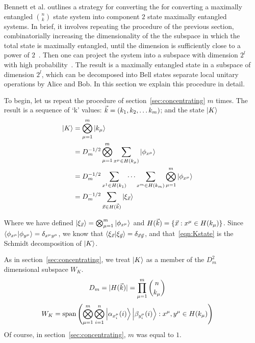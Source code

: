 Bennett et al. outlines a strategy for converting the for converting a maximally entangled $\binom{n}{k}$ state system into component $2$ state maximally entangled systems. 
In brief, it involves repeating the procedure of the previous section, combinatorially increasing the dimensionality of the the subspace in which the total state is maximally entangled, until the dimension is sufficiently close to a power of $2$~\cite{bennett1996concentrating}.
Then one can project the system into a subspace with dimension $2^l$ with high probability~\cite{bennett1996concentrating}.
The result is a maximally entangled state in a subspace of dimension $2^l$, which can be decomposed into Bell states separate local unitary operations by Alice and Bob.
In this section we explain this procedure in detail.

To begin, let us repeat the procedure of section~\ref{sec:concentrating} $m$ times. The result is a sequence of `k' values: ${\vec{k}} = \left( k_1, k_2,\ldots k_m \right)$; and the state
$\ket{K}$
\begin{align}
\ket{K} &= \bigotimes_{\mu=1}^m \ket{k_\mu} \nonumber \\
&= D_m^{-1/2} \bigotimes_{\mu=1}^m \sum_{x^\mu \in H(k_\mu)} \ket{\phi_{x^\mu}} \nonumber \\
&=  D_m^{-1/2} \sum_{x^1 \in H(k_1)} \cdots \sum_{x^m \in H(k_m)} \bigotimes_{\mu=1}^m  \ket{\phi_{x^\mu}} \nonumber \\
\label{eqn:Kstate}
&=  D_m^{-1/2} \sum_{{\vec{x}} \in H({\vec{k}})} \ket{ \xi_{\vec{x}} }
\end{align}

Where we have defined $\ket{ \xi_{\vec{x}} } = \bigotimes_{\mu=1}^m  \ket{\phi_{x^\mu}}$ and $H({\vec{k}}) = \{{\vec{x}}: x^\mu \in H(k_\mu)\}$.
Since $\braket{\phi_{x^\mu}}{\phi_{y^\mu}} = \delta_{x^\mu y^\mu}$, we know that $\braket{\xi_{\vec{x}}}{\xi_{\vec{y}}} = \delta_{{\vec{x}} {\vec{y}}}$, and that~\eqref{eqn:Kstate} is the Schmidt decomposition of $\ket{K}$.

As in section~\ref{sec:concentrating}, we treat $\ket{K}$ as a member of the $D_m^2$ dimensional subspace $W_K$.
\begin{equation*}
D_m = |H({\vec{k}})| = \prod_{\mu=1}^{m} \binom{n}{k_\mu}
\end{equation*}
\begin{equation*}
W_K = \text{span}\left(\bigotimes_{\mu=1}^m\bigotimes_{i=1}^n 
\ket{\alpha_{x_i^\mu}(i)} \ket{\beta_{y_i^\mu}(i)}: x^\mu,y^\mu \in H(k_\mu)\right)
\end{equation*}
Of course, in section~\ref{sec:concentrating}, $m$ was equal to $1$.


